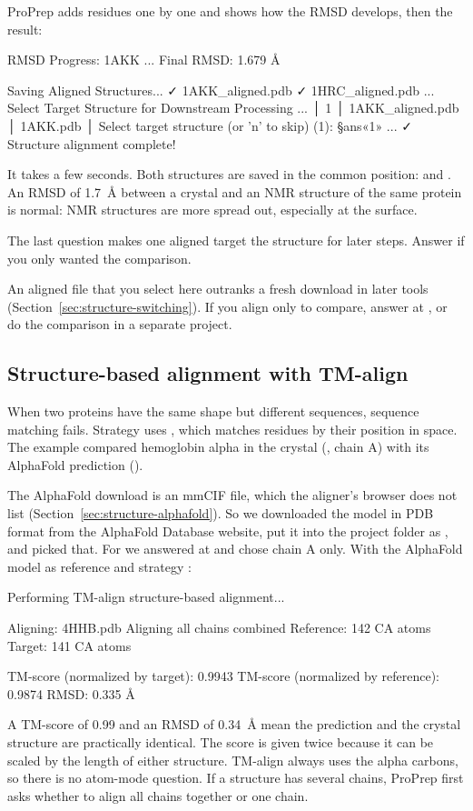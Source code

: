ProPrep adds residues one by one and shows how the RMSD develops, then the
result:
\begin{screen}
RMSD Progress: 1AKK
...
  Final RMSD: 1.679 Å

Saving Aligned Structures...
✓ 1AKK_aligned.pdb
✓ 1HRC_aligned.pdb
...
Select Target Structure for Downstream Processing
...
│ 1 │ 1AKK_aligned.pdb │ 1AKK.pdb │
Select target structure (or 'n' to skip) (1): §ans«1»
...
✓ Structure alignment complete!
\end{screen}
It takes a few seconds. Both structures are saved in the common position:
 and . An RMSD of 1.7~Å between
a crystal and an NMR structure of the same protein is normal: NMR structures
are more spread out, especially at the surface.

The last question makes one aligned target the structure for later steps.
Answer  if you only wanted the comparison.

\begin{watchout}
An aligned file that you select here outranks a fresh download in later tools
(Section~\ref{sec:structure-switching}). If you align only to compare, answer
 at , or do the comparison in a separate
project.
\end{watchout}

\subsection{Structure-based alignment with TM-align}

When two proteins have the same shape but different sequences, sequence
matching fails. Strategy  uses , which matches residues
by their position in space. The example compared hemoglobin alpha in the
crystal (, chain A) with its AlphaFold prediction ().

The AlphaFold download is an mmCIF file, which the aligner's browser does not
list (Section~\ref{sec:structure-alphafold}). So we downloaded the model
in PDB format from the AlphaFold Database website, put it into the project
folder as , and picked that. For  we answered  at
 and chose chain A only. With the AlphaFold model
as reference and strategy :
\begin{screen}
Performing TM-align structure-based alignment...

Aligning: 4HHB.pdb
  Aligning all chains combined
  Reference: 142 CA atoms
  Target: 141 CA atoms

  TM-score (normalized by target): 0.9943
  TM-score (normalized by reference): 0.9874
  RMSD: 0.335 Å
\end{screen}
A TM-score of 0.99 and an RMSD of 0.34~Å mean the prediction and the crystal
structure are practically identical. The score is given twice because it can
be scaled by the length of either structure. TM-align always uses the alpha
carbons, so there is no atom-mode question. If a structure has several chains,
ProPrep first asks whether to align all chains together or one chain.

